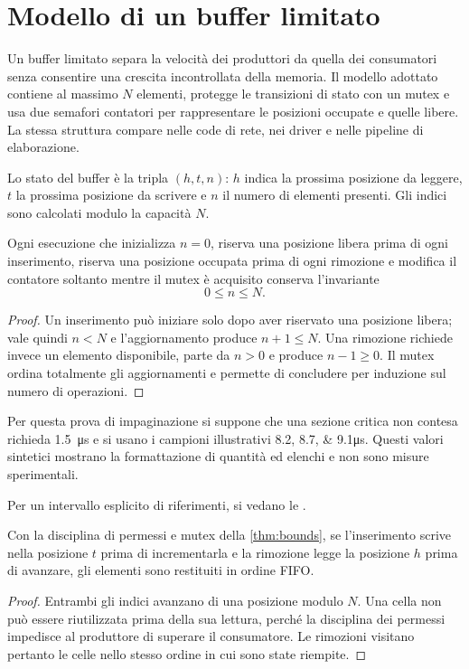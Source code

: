 \documentclass[italian]{../../unipd-notes}
\begin{document}
\makecoursefrontmatter
\makecoursemainmatter

\chapter{Modello di un buffer limitato}

Un buffer limitato separa la velocità dei produttori da quella dei consumatori senza consentire una crescita incontrollata della memoria. Il modello adottato contiene al massimo $N$ elementi, protegge le transizioni di stato con un mutex e usa due semafori contatori per rappresentare le posizioni occupate e quelle libere. La stessa struttura compare nelle code di rete, nei driver e nelle pipeline di elaborazione.

\begin{definition}
Lo stato del buffer è la tripla $(h,t,n)$: $h$ indica la prossima posizione da leggere, $t$ la prossima posizione da scrivere e $n$ il numero di elementi presenti. Gli indici sono calcolati modulo la capacità $N$.
\end{definition}

\begin{theorem}\label{thm:bounds}
Ogni esecuzione che inizializza $n=0$, riserva una posizione libera prima di ogni inserimento, riserva una posizione occupata prima di ogni rimozione e modifica il contatore soltanto mentre il mutex è acquisito conserva l'invariante
\[
  0 \leq n \leq N.
\]
\end{theorem}
\begin{proof}
Un inserimento può iniziare solo dopo aver riservato una posizione libera; vale quindi $n<N$ e l'aggiornamento produce $n+1\leq N$. Una rimozione richiede invece un elemento disponibile, parte da $n>0$ e produce $n-1\geq0$. Il mutex ordina totalmente gli aggiornamenti e permette di concludere per induzione sul numero di operazioni.
\end{proof}

Per questa prova di impaginazione si suppone che una sezione critica non contesa richieda \qty{1.5}{\micro\second} e si usano i campioni illustrativi \numlist{8.2;8.7;9.1}\unit{\micro\second}. Questi valori sintetici mostrano la formattazione di quantità ed elenchi e non sono misure sperimentali.

Per un intervallo esplicito di riferimenti, si vedano le .

\begin{theorem}\label{thm:fifo}
Con la disciplina di permessi e mutex della \cref{thm:bounds}, se l'inserimento scrive nella posizione $t$ prima di incrementarla e la rimozione legge la posizione $h$ prima di avanzare, gli elementi sono restituiti in ordine FIFO.
\end{theorem}
\begin{proof}
Entrambi gli indici avanzano di una posizione modulo $N$. Una cella non può essere riutilizzata prima della sua lettura, perché la disciplina dei permessi impedisce al produttore di superare il consumatore. Le rimozioni visitano pertanto le celle nello stesso ordine in cui sono state riempite.
\end{proof}
\end{document}
